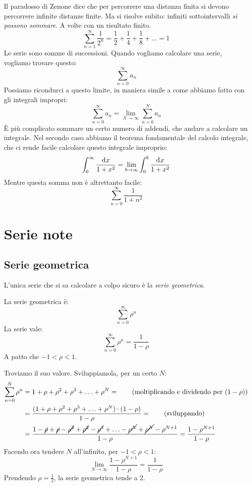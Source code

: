 Il paradosso di Zenone dice che per percorrere una distanza finita si devono percorrere infinite distanze finite. Ma si risolve subito: infiniti sottointervalli \emph{si possono sommare}. A volte con un risultato finito.
\[
\sum_{n = 1}^{\infty} \frac{1}{2^n} = \frac{1}{2} + \frac{1}{4} + \frac{1}{8} + \ldots = 1
\]
Le serie sono somme di successioni. Quando vogliamo calcolare una serie, vogliamo trovare questo:
\[
\sum_{n = 0}^{\infty} a_n
\]
Possiamo ricondurci a questo limite, in maniera simile a come abbiamo fatto con gli integrali impropri:
\[
\sum_{n = 0}^{\infty} a_n =
\lim_{N \to \infty} \sum_{n = 0}^{N} a_n
\]
\`E pi\`u complicato sommare un certo numero di addendi, che andare a calcolare un integrale. Nel secondo caso abbiamo il teorema fondamentale del calcolo integrale, che ci rende facile calcolare questo integrale improprio:
\[
\int_{0}^{\infty} \frac{\diff x}{1 + x^2} = \lim_{b \to \infty} \int_{0}^{b} \frac{\diff x}{1 + x^2}
\]
Mentre questa somma non \`e altrettanto facile:
\[
\sum_{n = 0}^{\infty} \frac{1}{1 + n^2}
\]

\section{Serie note}

\subsection{Serie geometrica}

L'unica serie che si sa calcolare a colpo sicuro \`e la \emph{serie geometrica}. 
\begin{defn}
La serie geometrica \`e:
\[
\sum_{n = 0}^{\infty} \rho^n
\]
La serie vale:
\[
\sum_{n = 0}^{\infty} \rho^n = 
\frac{1}{1 - \rho}
\]
A patto che $-1 < \rho < 1$.
\end{defn}

Troviamo il suo valore. Sviluppiamola, per un certo $N$:
\begin{align*}
\sum_{n = 0}^{N} \rho^n &=
1 + \rho + \rho^2 + \rho^3 + \ldots + \rho^N = \tag{moltiplicando e dividendo per $(1 - \rho)$} \\
&= \frac{(1 + \rho + \rho^2 + \rho^3 + \ldots + \rho^N) \cdot (1 - \rho)}{1 - \rho} = \tag{sviluppando} \\
&= \frac{1 - \cancel{\rho} + \cancel{\rho} - \cancel{\rho^2} + \cancel{\rho^2} - \cancel{\rho^3} + \ldots - \cancel{\rho^{N}} + \cancel{\rho^{N}} - \rho^{N+1}}{1 - \rho} =
\frac{1 - \rho^{N+1}}{1 - \rho}
\end{align*}
Facendo ora tendere $N$ all'infinito, per $-1 < \rho < 1$:
\[
\lim_{N \to \infty} \frac{1 - \rho^{N + 1}}{1 - \rho} = \frac{1}{1 - \rho}
\]
Prendendo $\rho = \frac{1}{2}$, la serie geometrica tende a 2.

